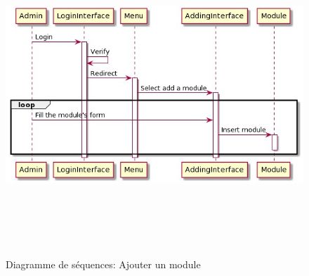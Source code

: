 \documentclass{article}
\begin{document}
{\begin{itemize}[label=\textbullet]
\end{itemize}
\begin{figure}[H]
\vspace{2cm}
    \center
    \includegraphics[width=16cm,height=12cm]{seqAdmin.jpeg}
    \caption{Diagramme de séquences: Ajouter un module}
    \label{fig:Diagramme de séquaneces: Ajouter un module.}
\end{figure}

\vspace{1cm}
}
\end{document}
